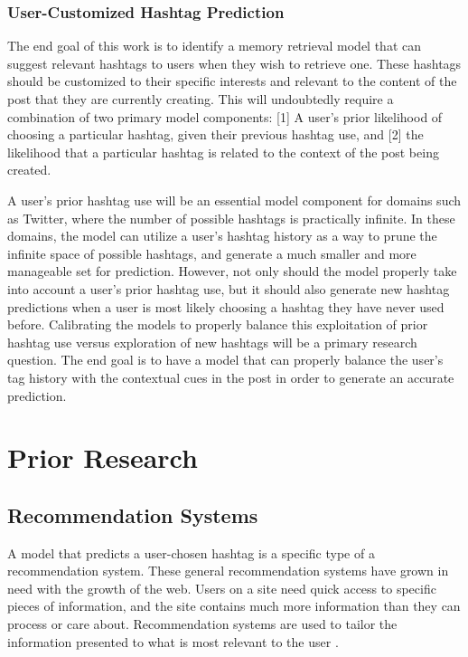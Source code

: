 \documentclass[man,floatsintext,donotrepeattitle]{apa6}
\begin{document}
\subsubsection{User-Customized Hashtag Prediction}

The end goal of this work is to identify a memory retrieval model that can suggest relevant hashtags to users when they wish to retrieve one.
These hashtags should be customized to their specific interests and relevant to the content of the post that they are currently creating.
This will undoubtedly require a combination of two primary model components:
[1] A user's prior likelihood of choosing a particular hashtag, given their previous hashtag use, and [2] the likelihood that a particular hashtag is related to the context of the post being created. 

A user's prior hashtag use will be an essential model component for domains such as Twitter, where the number of possible hashtags is practically infinite.
In these domains, the model can utilize a user's hashtag history as a way to prune the infinite space of possible hashtags, and generate a much smaller and more manageable set for prediction.
However, not only should the model properly take into account a user's prior hashtag use, but it should also generate new hashtag predictions when a user is most likely choosing a hashtag they have never used before.
Calibrating the models to properly balance this exploitation of prior hashtag use versus exploration of new hashtags will be a primary research question.
The end goal is to have a model that can properly balance the user's tag history with the contextual cues in the post in order to generate an accurate prediction.

\section{Prior Research}

\subsection{Recommendation Systems}

A model that predicts a user-chosen hashtag is a specific type of a recommendation system.
These general recommendation systems have grown in need with the growth of the web.
Users on a site need quick access to specific pieces of information, and the site contains much more information than they can process or care about.
Recommendation systems are used to tailor the information presented to what is most relevant to the user \parencite{Pazzani2007}.
\end{document}
